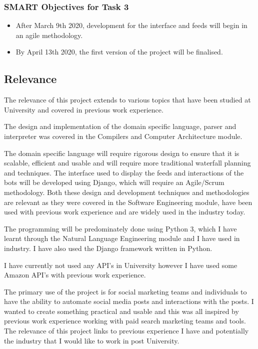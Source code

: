 \documentclass[chapterprefix=false]{scrreprt}
\begin{document}
\subsubsection{SMART Objectives for Task 3}

\begin{itemize}
 \setlength\itemsep{-0.75em}
 \item After March 9th 2020, development for the interface and feeds will begin in an agile methodology.
\item By April 13th 2020, the first version of the project will be finalised.
\end{itemize}

 
\subsection{Relevance}
 
The relevance of this project extends to various topics that have been studied at University and covered in previous work experience.

The design and implementation of the domain specific language, parser and interpreter was covered in the Compilers and Computer Architecture module. 

The domain specific language will require rigorous design to ensure that it is scalable, efficient and usable and will require more traditional waterfall planning and techniques. The interface used to display the feeds and interactions of the bots will be developed using Django, which will require an Agile/Scrum methodology. Both these design and development techniques and methodologies are relevant as they were covered in the Software Engineering module, have been used with previous work experience and are widely used in the industry today. 

The programming will be predominately done using Python 3, which I have learnt through the Natural Language Engineering module and I have used in industry. I have also used the Django framework written in Python. 

I have currently not used any API’s in University however I have used some Amazon API’s with previous work experience. 

The primary use of the project is for social marketing teams and individuals to have the ability to automate social media posts and interactions with the posts. I wanted to create something practical and usable and this was all inspired by previous work experience working with paid search marketing teams and tools. The relevance of this project links to previous experience I have and potentially the industry that I would like to work in post University.
\end{document}
